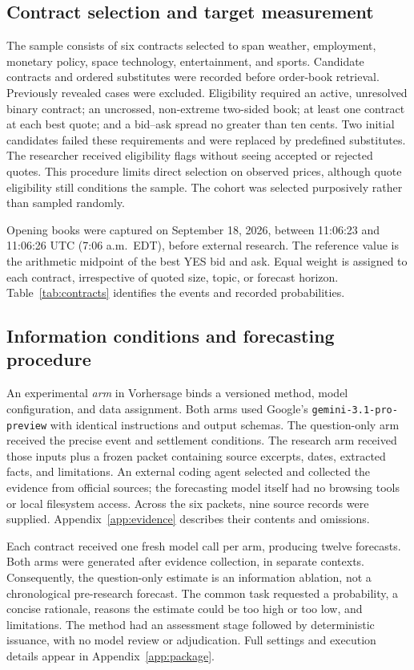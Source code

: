 \documentclass[11pt,letterpaper]{article}
\begin{document}
\subsection{Contract selection and target measurement}
The sample consists of six contracts selected to span weather, employment,
monetary policy, space technology, entertainment, and sports. Candidate
contracts and ordered substitutes were recorded before order-book retrieval.
Previously revealed cases were excluded. Eligibility required an active,
unresolved binary contract; an uncrossed, non-extreme two-sided book; at least
one contract at each best quote; and a bid--ask spread no greater than ten
cents. Two initial candidates failed these requirements and were replaced by
predefined substitutes. The researcher received eligibility flags without
seeing accepted or rejected quotes. This procedure limits direct selection on
observed prices, although quote eligibility still conditions the sample. The
cohort was selected purposively rather than sampled randomly.

Opening books were captured on September 18, 2026, between 11:06:23 and
11:06:26 UTC (7:06 a.m.\ EDT), before external research. The reference value is
the arithmetic midpoint of the best YES bid and ask. Equal weight is assigned
to each contract, irrespective of quoted size, topic, or forecast horizon.
Table~\ref{tab:contracts} identifies the events and recorded probabilities.

\subsection{Information conditions and forecasting procedure}
An experimental \emph{arm} in Vorhersage binds a versioned method, model
configuration, and data assignment. Both arms used Google's
\texttt{gemini-3.1-pro-preview} with identical instructions and output schemas.
The question-only arm received the precise event and settlement conditions.
The research arm received those inputs plus a frozen packet containing source
excerpts, dates, extracted facts, and limitations. An external coding agent
selected and collected the evidence from official sources; the forecasting
model itself had no browsing tools or local filesystem access. Across the
six packets, nine source records were supplied. Appendix~\ref{app:evidence}
describes their contents and omissions.

Each contract received one fresh model call per arm, producing twelve
forecasts. Both arms were generated after evidence collection, in separate
contexts. Consequently, the question-only estimate is an information
ablation, not a chronological pre-research forecast. The common task requested
a probability, a concise rationale, reasons the estimate could be too high or
too low, and limitations. The method had an assessment stage followed by
deterministic issuance, with no model review or adjudication. Full settings
and execution details appear in Appendix~\ref{app:package}.
\end{document}

